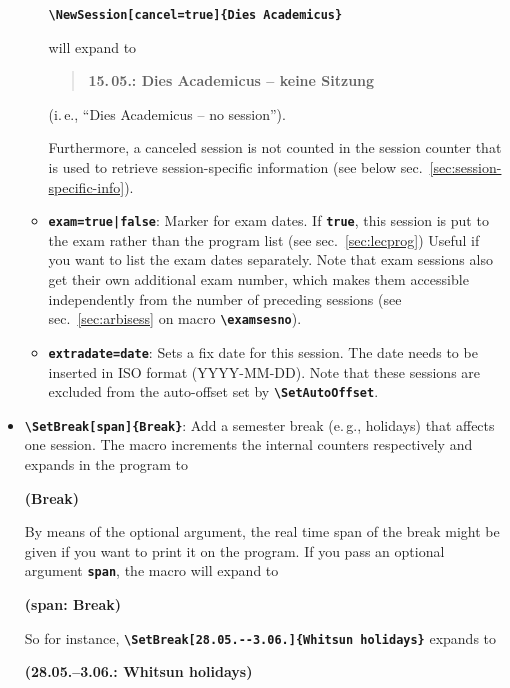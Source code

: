\documentclass[english]{article}
\newcommand*\jmacro[1]{\textbf{\texttt{#1}}}
\newcommand*\jcsmacro[1]{\jmacro{\textbackslash{#1}}}
\newcommand*\joption[1]{\textbf{\texttt{#1}}}
\newcommand*\jparam[1]{\angus #1\angud}
\begin{document}
\begin{itemize}
\begin{itemize}
\jcsmacro{NewSession[cancel=true]\{Dies Academicus\}}

will expand to
\begin{quote}
\textbf{15.\,05.: Dies Academicus -- keine Sitzung}
\end{quote}

(i.\,e., ``Dies Academicus -- no session'').

Furthermore, a canceled session is not counted in the session counter
that is used to retrieve session-specific information
(see below sec.~\ref{sec:session-specific-info}).
\item \joption{exam=\jparam{true|false}}: Marker for exam dates. If \joption{true},
      this session is put to the exam rather than the program list (see sec.~\ref{sec:lecprog})
      Useful if you want to list the exam dates separately. Note that exam sessions also get their
      own additional exam number, which makes them accessible independently from the number of
      preceding sessions (see sec.~\ref{sec:arbisess} on macro \jcsmacro{examsesno}).
\item \joption{extradate=\jparam{date}}: Sets a fix date for this session. The date needs
      to be inserted in ISO format (YYYY-MM-DD). Note that these sessions are excluded from
      the auto-offset set by \jcsmacro{SetAutoOffset}.
\end{itemize}
\item \jcsmacro{SetBreak[\jparam{span}]\{Break\}}: Add a semester break
(e.\,g., holidays) that affects one session. The macro increments
the internal counters respectively and expands in the program to

\begin{center}
\textbf{(Break)}
\par\end{center}

By means of the optional argument, the real time span of the break
might be given if you want to print it on the program. If you pass
an optional argument \joption{\jparam{span}}, the macro will expand to

\begin{center}
\textbf{(\jparam{span}: Break)}
\par\end{center}

So for instance, \jcsmacro{SetBreak[28.05.-{}-3.06.]\{Whitsun holidays\}}
expands to


\begin{center}
\textbf{(28.05.--3.06.: Whitsun holidays)}
\par\end{center}


\end{itemize}
\end{document}
